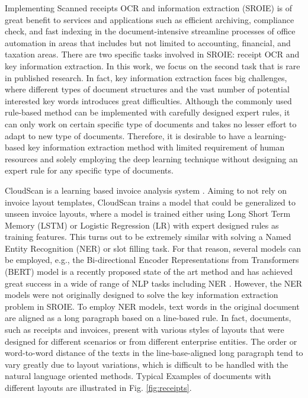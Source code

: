 \documentclass[10pt,twocolumn,letterpaper]{article}
\begin{document}
Implementing Scanned receipts OCR and information extraction (SROIE) is of great benefit to services and applications such as efficient archiving, compliance check, and fast indexing in the document-intensive streamline processes of office automation in areas that includes but not limited to accounting, financial, and taxation areas. There are two specific tasks involved in SROIE: receipt OCR and key information extraction. In this work, we focus on the second task that is rare in published research. In fact, key information extraction faces big challenges, where different types of document structures and the vast number of potential interested key words introduces great difficulties. Although the commonly used rule-based method can be implemented with carefully designed expert rules, it can only work on certain specific type of documents and takes no lesser effort to adapt to new type of documents. Therefore, it is desirable to have a learning-based key information extraction method with limited requirement of human resources and solely employing the deep learning technique without designing an expert rule for any specific type of documents. 

CloudScan is a learning based invoice analysis system \cite{cloudscan}. Aiming to not rely on invoice layout templates, CloudScan trains a model that could be generalized to unseen invoice layouts, where a model is trained either using Long Short Term Memory (LSTM) or Logistic Regression (LR) with expert designed rules as training features. This turns out to be extremely similar with solving a Named Entity Recognition (NER) or slot filling task. For that reason, several models can be employed, e.g., the Bi-directional Encoder Representations from Transformers (BERT) model is a recently proposed state of the art method and has achieved great success in a wide of range of NLP tasks including NER \cite{bert}. However, the NER models were not originally designed to solve the key information extraction problem in SROIE. To employ NER models, text words in the original document are aligned as a long paragraph based on a line-based rule. In fact, documents, such as receipts and invoices, present with various styles of layouts that were designed for different scenarios or from different enterprise entities. The order or word-to-word distance of the texts in the line-base-aligned long paragraph tend to vary greatly due to layout variations, which is difficult to be handled with the natural language oriented methods. Typical Examples of documents with different layouts are illustrated in Fig. \ref{fig:receipts}.
\end{document}
